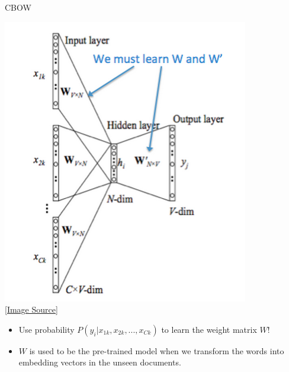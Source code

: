 \begin{frame}[fragile]{CBOW}

  \begin{center}
    \includegraphics[scale=0.3]{../images/img_5.png} \\
    \href{https://web.stanford.edu/class/archive/cs/cs224n/cs224n.1214/readings/cs224n-2019-notes01-wordvecs1.pdf}{[Image Source]}
  \end{center}

  \begin{itemize}
    \item Use probability $P(y_{i} | x_{1k}, x_{2k}, ... , x_{Ck})$ to learn the weight matrix $W$!
    \item $W$ is used to be the pre-trained model when we transform the words into embedding vectors in the unseen documents.
  \end{itemize}

\end{frame}